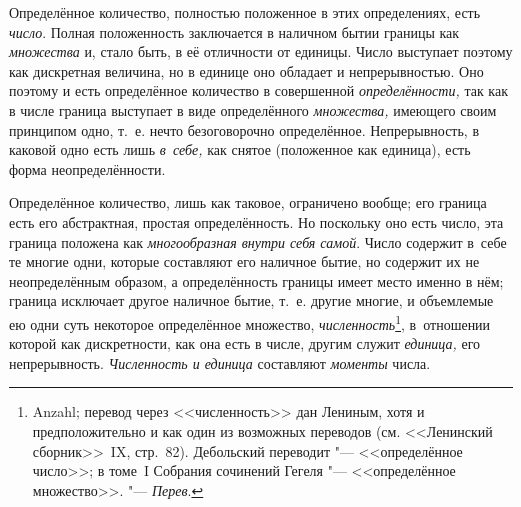 Определённое количество, полностью положенное в этих определениях, есть
{\em число}. Полная положенность заключается в наличном бытии границы как
{\em множества} и, стало быть, в её отличности от единицы. Число выступает
поэтому как дискретная величина, но в единице оно обладает и непрерывностью. Оно
поэтому и есть определённое количество в совершенной
{\em определённости,} так как в числе граница выступает в виде определённого
{\em множества,} имеющего своим принципом одно, т.~е. нечто безоговорочно
определённое. Непрерывность, в каковой одно есть лишь {\em в~себе,} как снятое
(положенное как единица), есть форма неопределённости.

Определённое количество, лишь как таковое, ограничено вообще; его граница есть
его абстрактная, простая определённость. Но поскольку оно есть число, эта
граница положена как {\em многообразная внутри себя самой}. Число содержит в~себе те
многие одни, которые составляют его наличное бытие, но содержит их не
неопределённым образом, а определённость границы имеет место именно в нём;
граница исключает другое наличное бытие, т.~е. другие многие, и объемлемые ею
одни суть некоторое определённое множество, {\em численность}\footnote{Anzahl;
перевод через <<численность>> дан Лениным, хотя и предположительно и как один
из возможных переводов (см. <<Ленинский сборник>>~IX, стр.~82). Дебольский
переводит "--- <<определённое число>>; в томе~I Собрания сочинений Гегеля "---
<<определённое множество>>. "--- {\em Перев}.}, в~отношении которой как
дискретности, как она есть в числе, другим служит {\em единица,} его
непрерывность. {\em Численность и единица} составляют {\em моменты} числа.

